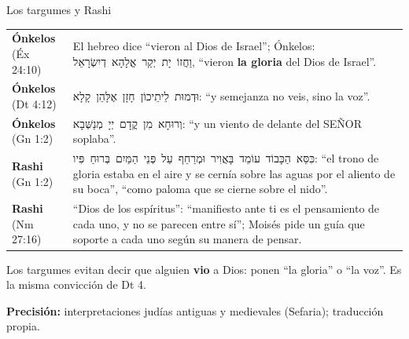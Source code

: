 \documentclass[hyperref={bookmarks=false},aspectratio=169]{beamer}
\newcommand{\heb}[1]{\mbox{\foreignlanguage{hebrew}{#1}}}
\newcommand{\SENOR}{S{\fontsize{0.78em}{1em}\selectfont EÑOR}}
\newcommand{\destacar}[1]{\textbf{\textcolor{azul}{#1}}}
\newcommand{\precision}[1]{{\footnotesize\color{gris}\textbf{Precisión:} #1}}
\begin{document}
\begin{frame}{Los targumes y Rashi}
\scriptsize\renewcommand{\arraystretch}{1.18}
\begin{tabular}{@{}>{\RaggedRight\arraybackslash}p{2.4cm}>{\RaggedRight\arraybackslash}p{9.4cm}@{}}
\toprule
\textbf{Ónkelos} (Éx 24:10) & El hebreo dice ``vieron al Dios de Israel''; Ónkelos: \heb{וַחֲזוֹ יָת יְקַר אֱלָהָא דְיִשְׂרָאֵל}, ``vieron \destacar{la gloria} del Dios de Israel''. \\
\textbf{Ónkelos} (Dt 4:12) & \heb{וּדְמוּת לֵיתֵיכוֹן חָזָן אֶלָּהֵן קָלָא}: ``y semejanza no veis, sino la voz''. \\
\textbf{Ónkelos} (Gn 1:2) & \heb{וְרוּחָא מִן קֳדָם יְיָ מְנַשְּׁבָא}: ``y un viento de delante del \SENOR{} soplaba''. \\
\textbf{Rashi} (Gn 1:2) & \heb{כִּסֵּא הַכָּבוֹד עוֹמֵד בָּאֲוִיר וּמְרַחֵף עַל פְּנֵי הַמַּיִם בְּרוּחַ פִּיו}: ``el trono de gloria estaba en el aire y se cernía sobre las aguas por el aliento de su boca'', ``como paloma que se cierne sobre el nido''. \\
\textbf{Rashi} (Nm 27:16) & ``Dios de los espíritus'': ``manifiesto ante ti es el pensamiento de cada uno, y no se parecen entre sí''; Moisés pide un guía que soporte a cada uno según su manera de pensar. \\
\bottomrule
\end{tabular}\par\medskip
\small\RaggedRight Los targumes evitan decir que alguien \destacar{vio} a Dios: ponen ``la gloria'' o ``la voz''. Es la misma convicción de Dt 4.\par\smallskip
\precision{interpretaciones judías antiguas y medievales (Sefaria); traducción propia.}
\end{frame}
\end{document}
